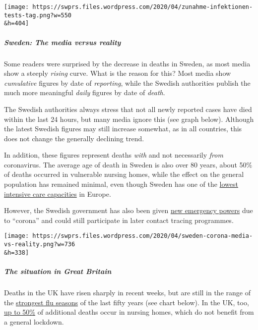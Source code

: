 \texttt{[image: https://swprs.files.wordpress.com/2020/04/zunahme-infektionen-tests-tag.png?w=550\\\&h=404]}

\hypertarget{sweden-the-media-versus-reality}{%
\subparagraph{\texorpdfstring{\textbf{Sweden: The media versus
reality}}{Sweden: The media versus reality}}\label{sweden-the-media-versus-reality}}

Some readers were surprised by the decrease in deaths in Sweden, as most
media show a steeply \emph{rising} curve. What is the reason for this?
Most media show \emph{cumulative} figures by date of \emph{reporting},
while the Swedish authorities publish the much more meaningful
\emph{daily} figures by date of \emph{death}.

The Swedish authorities always stress that not all newly reported cases
have died within the last 24 hours, but many media ignore this (see
graph below). Although the latest Swedish figures may still increase
somewhat, as in all countries, this does not change the generally
declining trend.

In addition, these figures represent deaths \emph{with} and not
necessarily \emph{from} coronavirus. The average age of death in Sweden
is also over 80 years, about 50\% of deaths occurred in vulnerable
nursing homes, while the effect on the general population has remained
minimal, even though Sweden has one of the
\href{https://link.springer.com/article/10.1007/s00134-012-2627-8}{lowest
intensive care capacities} in Europe.

However, the Swedish government has also been given
\href{https://www.tagesschau.de/faktenfinder/ausland/corona-kursaenderung-schweden-103.html}{new
emergency powers} due to ``corona'' and could still participate in later
contact tracing programmes.

\texttt{[image: https://swprs.files.wordpress.com/2020/04/sweden-corona-media-vs-reality.png?w=736\\\&h=338]}

\hypertarget{the-situation-in-great-britain}{%
\subparagraph{\texorpdfstring{\textbf{The situation in Great
Britain}}{The situation in Great Britain}}\label{the-situation-in-great-britain}}

Deaths in the UK have risen sharply in recent weeks, but are still in
the range of the \href{http://inproportion2.talkigy.com/}{strongest flu
seasons} of the last fifty years (see chart below). In the UK, too,
\href{https://ltccovid.org/2020/04/12/mortality-associated-with-covid-19-outbreaks-in-care-homes-early-international-evidence/}{up
to 50\%} of additional deaths occur in nursing homes, which do not
benefit from a general lockdown.

